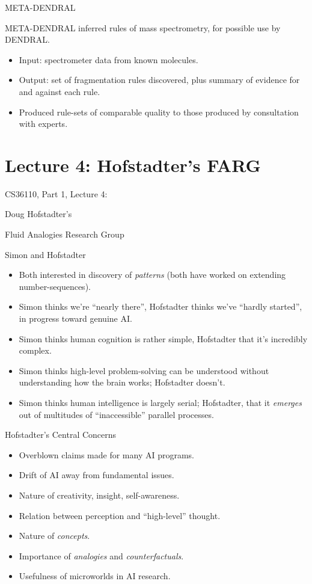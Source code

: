 \documentclass{article}
\begin{document}
\begin{slide}
{\Large META-DENDRAL}

META-DENDRAL inferred rules of mass spectrometry, for possible use by
DENDRAL.
\begin{itemize}
\item Input: spectrometer data from known molecules.
\item Output: set of fragmentation rules discovered, plus summary of
evidence for and against each rule.
\item Produced rule-sets of comparable quality to those produced by
consultation with experts.
\end{itemize}
\end{slide}
\section{Lecture 4: Hofstadter's FARG}
\begin{slide}{}
{\Large CS36110, Part 1, Lecture 4:}

{\Large Doug Hofstadter's}

{\Large Fluid Analogies Research Group}

\end{slide}

\begin{slide}{}
{\Large Simon and Hofstadter}
\begin{itemize}
\item Both interested in discovery of {\em patterns} (both have worked
on extending number-sequences).
\item Simon thinks we're ``nearly there'', Hofstadter thinks we've
``hardly started'', in progress toward genuine AI.
\item Simon thinks human cognition is rather simple, Hofstadter that
it's incredibly complex.
\item Simon thinks high-level problem-solving can be understood
without understanding how the brain works; Hofstadter doesn't.
\item Simon thinks human intelligence is largely serial; Hofstadter, that it
{\em emerges} out of multitudes of ``inaccessible'' parallel
processes.
\end{itemize}
\end{slide}

\begin{slide}{}
{\Large Hofstadter's Central Concerns}
\begin{itemize}
\item Overblown claims made for many AI programs.
\item Drift of AI away from fundamental issues.
\item Nature of creativity, insight, self-awareness.
\item Relation between perception and ``high-level'' thought.
\item Nature of {\em concepts}.
\item Importance of {\em analogies} and {\em counterfactuals}.
\item Usefulness of microworlds in AI research.
\end{itemize}
\end{slide}
\end{document}
